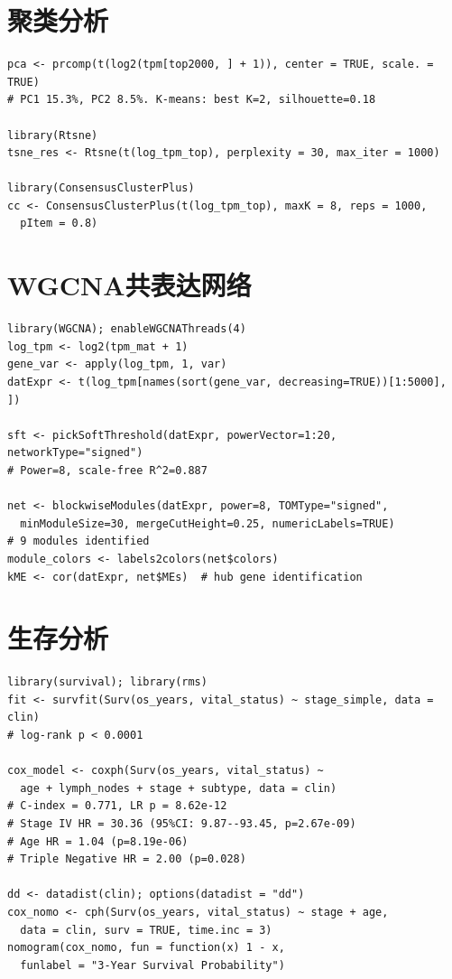 \documentclass[12pt,a4paper,openany]{ctexbook}
\begin{document}
\section{聚类分析}
\begin{lstlisting}[caption={PCA/t-SNE/K-means/共识聚类}, basicstyle=\ttfamily\scriptsize]
pca <- prcomp(t(log2(tpm[top2000, ] + 1)), center = TRUE, scale. = TRUE)
# PC1 15.3%, PC2 8.5%. K-means: best K=2, silhouette=0.18

library(Rtsne)
tsne_res <- Rtsne(t(log_tpm_top), perplexity = 30, max_iter = 1000)

library(ConsensusClusterPlus)
cc <- ConsensusClusterPlus(t(log_tpm_top), maxK = 8, reps = 1000,
  pItem = 0.8)
\end{lstlisting}

\section{WGCNA共表达网络}
\begin{lstlisting}[caption={WGCNA网络构建}, basicstyle=\ttfamily\scriptsize]
library(WGCNA); enableWGCNAThreads(4)
log_tpm <- log2(tpm_mat + 1)
gene_var <- apply(log_tpm, 1, var)
datExpr <- t(log_tpm[names(sort(gene_var, decreasing=TRUE))[1:5000], ])

sft <- pickSoftThreshold(datExpr, powerVector=1:20, networkType="signed")
# Power=8, scale-free R^2=0.887

net <- blockwiseModules(datExpr, power=8, TOMType="signed",
  minModuleSize=30, mergeCutHeight=0.25, numericLabels=TRUE)
# 9 modules identified
module_colors <- labels2colors(net$colors)
kME <- cor(datExpr, net$MEs)  # hub gene identification
\end{lstlisting}

\section{生存分析}
\begin{lstlisting}[caption={KM/Cox/Nomogram}, basicstyle=\ttfamily\scriptsize]
library(survival); library(rms)
fit <- survfit(Surv(os_years, vital_status) ~ stage_simple, data = clin)
# log-rank p < 0.0001

cox_model <- coxph(Surv(os_years, vital_status) ~
  age + lymph_nodes + stage + subtype, data = clin)
# C-index = 0.771, LR p = 8.62e-12
# Stage IV HR = 30.36 (95%CI: 9.87--93.45, p=2.67e-09)
# Age HR = 1.04 (p=8.19e-06)
# Triple Negative HR = 2.00 (p=0.028)

dd <- datadist(clin); options(datadist = "dd")
cox_nomo <- cph(Surv(os_years, vital_status) ~ stage + age,
  data = clin, surv = TRUE, time.inc = 3)
nomogram(cox_nomo, fun = function(x) 1 - x,
  funlabel = "3-Year Survival Probability")
\end{lstlisting}
\end{document}
